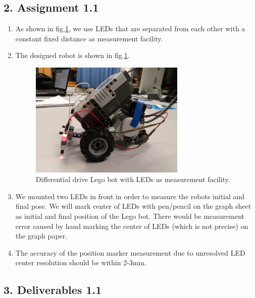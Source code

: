 \documentclass[11pt,a4paper,openright,twoside]{extreport}
\begin{document}
\subsection*{2. Assignment 1.1}
\begin{enumerate}
\item As shown in fig.\ref{legobot}, we use LEDs that are separated from each other with a constant fixed distance as measurement facility.
\item The designed robot is shown in fig.\ref{legobot}.
\begin{figure}[ht]
\begin{center}
\includegraphics[width=0.7\textwidth]{lego_bot.jpg}
\caption{Differential drive Lego bot with LEDs as measurement facility.}
\label{legobot}
\end{center}
\end{figure}

\item We mounted two LEDs in front in order to measure the robots initial and final pose. We will mark center of LEDs with pen/pencil on the graph sheet as initial and final position of the Lego bot. There would be measurement error caused by hand marking the center of LEDs (which is not precise) on the graph paper.

\item The accuracy of the position marker measurement due to unresolved LED center resolution should be within 2-3mm.
\end{enumerate}

\subsection*{3. Deliverables 1.1}
\end{document}
